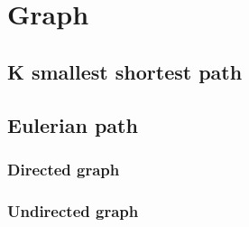\section{Graph}

\subsection{K smallest shortest path}

\subsection{Eulerian path}
	\subsubsection{Directed graph}
	\subsubsection{Undirected graph}

